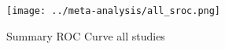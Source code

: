 \begin{figure}[p]
\centering

\texttt{[image: ../meta-analysis/all\_sroc.png]}

\caption[Summary ROC Curve all studies]{Summary ROC Curve all studies}
\label{fig:all_sroc}
\end{figure}
